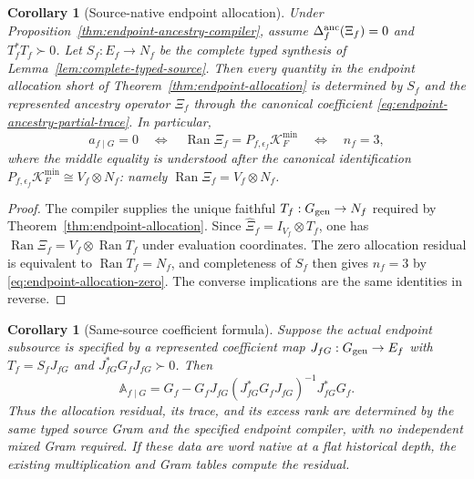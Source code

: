 \documentclass[11pt]{article}
\numberwithin{equation}{section}
\newtheorem{corollary}[theorem]{Corollary}
\theoremstyle{definition}
\theoremstyle{remark}
\newcommand{\Ran}{\operatorname{Ran}}
\begin{document}
\begin{corollary}[Source-native endpoint allocation]
\label{cor:source-native-endpoint-allocation}
Under Proposition~\ref{thm:endpoint-ancestry-compiler}, assume
$\Delta_f^{\rm anc}(\Xi_f)=0$ and $T_f^*T_f\succ0$.  Let
$S_f:E_f\to N_f$ be the complete typed synthesis of
Lemma~\ref{lem:complete-typed-source}.  Then every quantity in the endpoint
allocation short of Theorem~\ref{thm:endpoint-allocation} is determined by
$S_f$ and the represented ancestry operator $\Xi_f$ through the canonical
coefficient \eqref{eq:endpoint-ancestry-partial-trace}.  In particular,
\begin{equation}
a_{f\mid G}=0
 \quad\Longleftrightarrow\quad
 \Ran\Xi_f=P_{f,\epsilon_f}\mathcal K_F^{\min}
 \quad\Longleftrightarrow\quad n_f=3,
\label{eq:source-native-three-count}
\end{equation}
where the middle equality is understood after the canonical identification
$P_{f,\epsilon_f}\mathcal K_F^{\min}\cong V_f\otimes N_f$: namely
$\Ran\Xi_f=V_f\otimes N_f$.
\end{corollary}

\begin{proof}
The compiler supplies the unique faithful $T_f:G_{\rm gen}\to N_f$ required
by Theorem~\ref{thm:endpoint-allocation}.  Since
$\widehat\Xi_f=I_{V_f}\otimes T_f$, one has
$\Ran\Xi_f=V_f\otimes\Ran T_f$ under evaluation coordinates.  The zero
allocation residual is equivalent to $\Ran T_f=N_f$, and completeness of
$S_f$ then gives $n_f=3$ by
\eqref{eq:endpoint-allocation-zero}.  The converse implications are the same
identities in reverse.
\end{proof}

\begin{corollary}[Same-source coefficient formula]
\label{cor:endpoint-allocation-compiler}
Suppose the actual endpoint subsource is specified by a represented
coefficient map $J_{fG}:G_{\rm gen}\to E_f$ with
$T_f=S_fJ_{fG}$ and $J_{fG}^*G_fJ_{fG}\succ0$.  Then
\begin{equation}
 \mathbb A_{f\mid G}
 =G_f-G_fJ_{fG}(J_{fG}^*G_fJ_{fG})^{-1}J_{fG}^*G_f.
 \label{eq:endpoint-allocation-compiler}
\end{equation}
Thus the allocation residual, its trace, and its excess rank are determined
by the same typed source Gram and the specified endpoint compiler, with no
independent mixed Gram required.  If these data are word native at a flat
historical depth, the existing multiplication and Gram tables compute the
residual.
\end{corollary}
\end{document}
